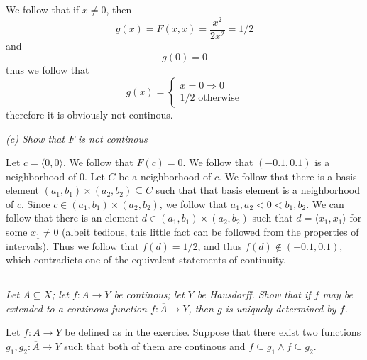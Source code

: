 \documentclass[11pt,oneside,titlepage]{book}
\DeclareMathOperator \ra {\Rightarrow}
\newcommand{\eangle}[1]{\langle #1 \rangle}
\begin{document}
We follow that if $x \neq 0$, then
$$g(x) = F(x, x) = \frac{x^2}{2x^2} = 1/2$$
and
$$g(0) = 0$$
thus we follow that
$$g(x) =
\begin{cases}
  x = 0 \ra 0  \\
  1/2 \text{ otherwise}
\end{cases}
$$
therefore it is obviously not continous.

\textit{(c) Show that $F$ is not continous}

Let $c = \eangle{0, 0}$. We follow that $F(c) = 0$. We follow that $(-0.1, 0.1)$ is a
neighborhood of $0$. Let $C$ be a neighborhood of $c$. We follow that there is a basis
element $(a_1, b_1) \times (a_2, b_2) \subseteq C$ such that that basis element is a
neighborhood of $c$. Since $c \in (a_1, b_1) \times (a_2, b_2)$,
we follow that $a_1, a_2 < 0 < b_1, b_2$. We can follow that
there is an element $d \in (a_1, b_1) \times (a_2, b_2)$ such that $d = \eangle{x_1, x_1}$
for some $x_1 \neq 0$ (albeit tedious, this little fact can be followed from the
properties of intervals). Thus we follow that $f(d) = 1/2$, and thus $f(d) \notin (-0.1, 0.1)$,
which contradicts one of the equivalent statements of continuity.

\subsection{}

\textit{Let $A \subseteq X$; let $f: A \to Y$ be continous; let $Y$ be Hausdorff. Show that
  if $f$ may be extended to a continous function $f: \overline{A} \to Y$, then $g$ is
  uniquely determined by $f$.}

Let $f: A \to Y$ be defined as in the exercise. Suppose that there exist two
functions $g_1, g_2: \overline{A} \to Y$ such that both of them are
continous and $f \subseteq g_1 \land f \subseteq g_2$.
\end{document}
